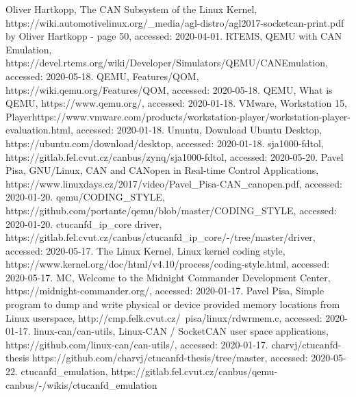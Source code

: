 \documentclass{ctuthesis}
\begin{document}
\begin{thebibliography}{1}
 Oliver Hartkopp, The CAN Subsystem of the Linux Kernel, https://wiki.automotivelinux.org/\_media/agl-distro/agl2017-socketcan-print.pdf by Oliver Hartkopp - page 50, accessed: 2020-04-01.
 RTEMS, QEMU with CAN Emulation, https://devel.rtems.org/wiki/Developer/Simulators/QEMU/CANEmulation, accessed: 2020-05-18.
 QEMU, Features/QOM, https://wiki.qemu.org/Features/QOM, accessed: 2020-05-18.
 QEMU, What is QEMU, https://www.qemu.org/, accessed: 2020-01-18.
 VMware, Workstation 15, Playerhttps://www.vmware.com/products/workstation-player/workstation-player-evaluation.html, accessed: 2020-01-18.
 Ununtu, Download Ubuntu Desktop, https://ubuntu.com/download/desktop, accessed: 2020-01-18.
 sja1000-fdtol, https://gitlab.fel.cvut.cz/canbus/zynq/sja1000-fdtol, accessed: 2020-05-20.
 Pavel Pisa, GNU/Linux, CAN and CANopen in Real-time Control Applications, https://www.linuxdays.cz/2017/video/Pavel\_Pisa-CAN\_canopen.pdf, accessed: 2020-01-20.
 qemu/CODING\_STYLE, https://github.com/portante/qemu/blob/master/CODING\_STYLE, accessed: 2020-01-20.
 ctucanfd\_ip\_core driver, https://gitlab.fel.cvut.cz/canbus/ctucanfd\_ip\_core/-/tree/master/driver, accessed: 2020-05-17.
 The Linux Kernel, Linux kernel coding style, https://www.kernel.org/doc/html/v4.10/process/coding-style.html, accessed: 2020-05-17.
 MC, Welcome to the Midnight Commander Development Center, https://midnight-commander.org/, accessed: 2020-01-17.
 Pavel Pisa, Simple program to dump and write physical or device provided
  memory locations from Linux userspace, http://cmp.felk.cvut.cz/~pisa/linux/rdwrmem.c, accessed: 2020-01-17.
 linux-can/can-utils, Linux-CAN / SocketCAN user space applications, https://github.com/linux-can/can-utils/, accessed: 2020-01-17.
 charvj/ctucanfd-thesis https://github.com/charvj/ctucanfd-thesis/tree/master, accessed: 2020-05-22.
 ctucanfd\_emulation, https://gitlab.fel.cvut.cz/canbus/qemu-canbus/-/wikis/ctucanfd\_emulation
\end{thebibliography}
 
\appendix
\end{document}

